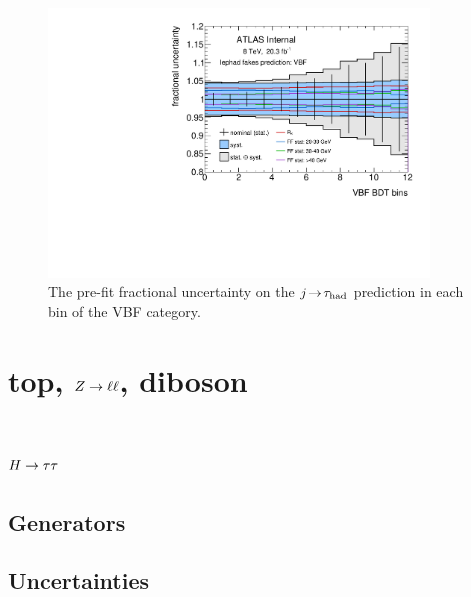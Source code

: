 \begin{figure}[tp]
  \includegraphics[width=0.90\textwidth]{figures/uncertainties/uncertainties_lephad_paper14_8TeV_fakes_VBF}
  \caption{The pre-fit fractional uncertainty on the $j\!\rightarrow\!\tau_\text{had}$ prediction in each bin of the VBF category.}
  \label{fig:backgrounds-uncertainties-fakes}
\end{figure}

\clearpage

\section{top, $Z \rightarrow \ell\ell$, diboson}
\label{sec:backgrounds-others}

\section{$H\rightarrow\tau\tau$}
\label{sec:backgrounds-htautau}

\subsection{Generators}

\subsection{Uncertainties}

